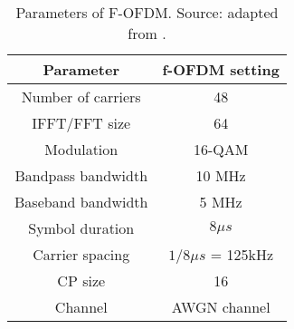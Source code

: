\begin{table}[h]
\centering
\caption{Parameters of F-OFDM. Source: adapted from \cite{cheng2016filtered}.}
\label{table:1}
\begin{tabular}{|c|c|}
\hline
\textbf{Parameter} & \textbf{f-OFDM setting} \\ \hline
Number of carriers & 48                      \\ \hline
IFFT/FFT size      & 64                      \\ \hline
Modulation         & 16-QAM                  \\ \hline
Bandpass bandwidth & 10 MHz                  \\ \hline
Baseband bandwidth & 5 MHz                  \\ \hline
Symbol duration    & $8 \mu s$               \\ \hline
Carrier spacing    & $1/8 \mu s$ = 125kHz    \\ \hline
CP size            & 16                      \\ \hline
Channel            & AWGN channel            \\ \hline
\end{tabular}
\end{table}